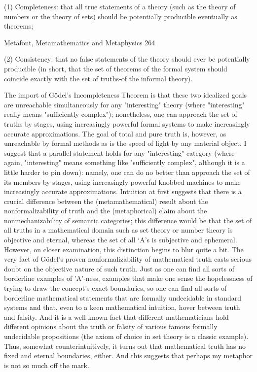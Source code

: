    (1) Completeness: that all true statements of a theory (such as the theory of
      numbers or the theory of sets) should be potentially producible eventually as
      theorems;




Metafont, Metamathematics and Metaphysics                                                  264

   (2) Consistency: that no false statements of the theory should ever be potentially
      producible (in short, that the set of theorems of the formal system should
      coincide exactly with the set of truths-of the informal theory).

   The import of Gödel’s Incompleteness Theorem is that these two idealized goals are
unreachable simultaneously for any "interesting" theory (where "interesting" really means
"sufficiently complex"); nonetheless, one can approach the set of truths by stages, using
increasingly powerful formal systems to make increasingly accurate approximations. The
goal of total and pure truth is, however, as unreachable by formal methods as is the speed
of light by any material object. I suggest that a parallel statement holds for any
"interesting" category (where again, "interesting" means something like "sufficiently
complex", although it is a little harder to pin down): namely, one can do no better than
approach the set of its members by stages, using increasingly powerful knobbed
machines to make increasingly accurate approximations.
   Intuition at first suggests that there is a crucial difference between the
(metamathematical) result about the nonformalizability of truth and the (metaphorical)
claim about the nonmechanizability of semantic categories; this difference would be that
the set of all truths in a mathematical domain such as set theory or number theory is
objective and eternal, whereas the set of all `A's is subjective and ephemeral. However,
on closer examination, this distinction begins to blur quite a bit. The very fact of Gödel’s
proven nonformalizability of mathematical truth casts serious doubt on the objective
nature of such truth. Just as one can find all sorts of borderline examples of 'A'-ness,
examples that make one sense the hopelessness of trying to draw the concept's exact
boundaries, so one can find all sorts of borderline mathematical statements that are
formally undecidable in standard systems and that, even to a keen mathematical intuition,
hover between truth and falsity. And it is a well-known fact that different mathematicians
hold different opinions about the truth or falsity of various famous formally undecidable
propositions (the axiom of choice in set theory is a classic example). Thus, somewhat
counterintuitively, it turns out that mathematical truth has no fixed and eternal
boundaries, either. And this suggests that perhaps my metaphor is not so much off the
mark.

